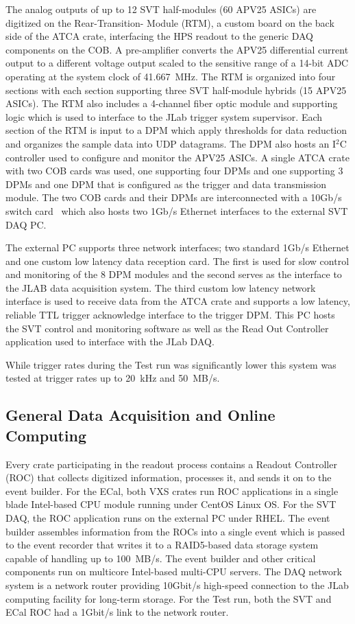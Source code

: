 \documentclass[final,3p,times,twocolumn]{elsarticle}
\begin{document}
The analog outputs of up to 12 SVT half-modules (60 APV25 ASICs) are digitized on the Rear-Transition-
Module (RTM), a custom board 
on the back side of the ATCA crate, interfacing the HPS readout to the generic DAQ components on the 
COB. A pre-amplifier converts the APV25 differential current output to a different voltage output scaled to 
the sensitive range of a 14-bit ADC operating at the system clock of 41.667~MHz. The RTM is organized 
into four sections with each section supporting three SVT half-module hybrids (15 APV25 ASICs). The 
RTM also includes a 4-channel fiber optic module and supporting logic which is used to interface 
to the JLab trigger system supervisor. Each section of the RTM is input to a DPM which apply thresholds 
for data reduction and organizes the sample data into UDP datagrams. The DPM also hosts an I$^{2}$C 
controller used to configure and monitor the APV25 ASICs. A single ATCA crate with two COB cards 
was used, one supporting four DPMs and one supporting 3 DPMs and one DPM that is configured as 
the trigger and data transmission module. The two COB cards and their DPMs are interconnected with a 
10Gb/s switch card~\cite{Larsen:2011zb} which also hosts two 1Gb/s Ethernet interfaces to the external 
SVT DAQ PC.  

The external PC supports three network interfaces; two standard 1Gb/s Ethernet and one custom low 
latency data reception card. The first is used for slow control and monitoring of the 8 
DPM modules and the second serves as the interface to the JLAB data acquisition system. The third 
custom low latency network interface is used to receive data from the ATCA crate and supports a low 
latency, reliable TTL trigger acknowledge interface to the trigger DPM. This PC hosts the SVT control 
and monitoring software as well as the Read Out Controller application used to interface with the 
JLab DAQ.

While trigger rates during the Test run was significantly lower this system was tested at trigger rates up 
to 20~kHz and 50~MB/s.




\subsection{General Data Acquisition and Online Computing}
\label{sec:daq}
Every crate participating in the readout process contains a Readout Controller (ROC) that 
collects digitized information, processes it, and sends it on to the event builder. For the ECal, both 
VXS crates run ROC applications in a single blade Intel-based CPU module running under CentOS 
Linux OS. For the SVT DAQ, the ROC application runs on the external PC under RHEL. 
The event builder assembles information from the ROCs into a single event which is passed to the 
event recorder that writes it to a RAID5-based data storage system capable of handling up to 
100~MB/s. The event builder and other critical components run on multicore Intel-based multi-CPU 
servers. The DAQ network system is a network router providing 10Gbit/s high-speed connection 
to the JLab computing facility for long-term storage. For the Test run, both the SVT and ECal ROC had a 
1Gbit/s link to the network router.
\end{document}
